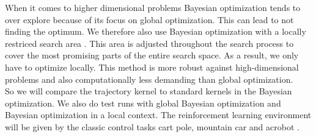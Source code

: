 When it comes to higher dimensional problems Bayesian optimization tends to over explore because of its focus on global optimization. This can lead to not finding the optimum. We therefore also use Bayesian optimization with a locally restriced search area \cite{akrour2017local}. This area is adjusted throughout the search process to cover the most promising parts of the entire search space. As a result, we only have to optimize locally. This method is more robust against high-dimensional problems and also computationally less demanding than global optimization.\\

So we will compare the trajectory kernel to standard kernels in the Bayesian optimization. We also do test runs with global Bayesian optimization and Bayesian optimization in a local context. The reinforcement learning environment will be given by the classic control tasks cart pole, mountain car and acrobot \cite{sutton1998reinforcement}.\\
